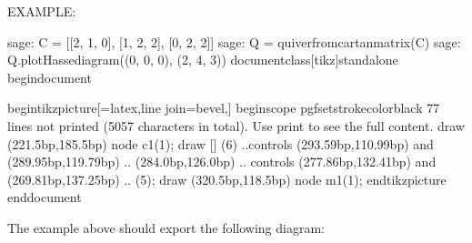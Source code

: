 \documentclass[letterpaper,10pt,english]{sphinxmanual}
\begin{document}
\begin{fulllineitems}
\begin{itemize}
\end{itemize}

\sphinxAtStartPar
EXAMPLE:

\begin{sphinxVerbatim}[commandchars=\\\{\}]
sage: C = [[2, \PYGZhy{}1, 0], [\PYGZhy{}1, 2, \PYGZhy{}2], [0, \PYGZhy{}2, 2]]
sage: Q = quiver\PYGZus{}from\PYGZus{}cartan\PYGZus{}matrix(C)
sage: Q.plot\PYGZus{}Hasse\PYGZus{}diagram((0, 0, 0), (2, 4, 3))
\PYGZbs{}documentclass[tikz]\PYGZob{}standalone\PYGZcb{}
\PYGZbs{}begin\PYGZob{}document\PYGZcb{}

\PYGZbs{}begin\PYGZob{}tikzpicture\PYGZcb{}[\PYGZgt{}=latex,line join=bevel,]
\PYGZpc{}\PYGZpc{}
\PYGZbs{}begin\PYGZob{}scope\PYGZcb{}
    \PYGZbs{}pgfsetstrokecolor\PYGZob{}black\PYGZcb{}
\PYGZhy{}\PYGZhy{}\PYGZhy{}
77 lines not printed (5057 characters in total).
Use print to see the full content.
\PYGZhy{}\PYGZhy{}\PYGZhy{}
    \PYGZbs{}draw (221.5bp,185.5bp) node \PYGZob{}\PYGZdl{}c\PYGZus{}\PYGZob{}1\PYGZcb{}(1)\PYGZdl{}\PYGZcb{};
    \PYGZbs{}draw [\PYGZhy{}\PYGZgt{}] (6) ..controls (293.59bp,110.99bp) and (289.95bp,119.79bp)  .. (284.0bp,126.0bp) .. controls (277.86bp,132.41bp) and (269.81bp,137.25bp)  .. (5);
    \PYGZbs{}draw (320.5bp,118.5bp) node \PYGZob{}\PYGZdl{}m\PYGZus{}\PYGZob{}1\PYGZcb{}(1)\PYGZdl{}\PYGZcb{};
\PYGZpc{}
\PYGZbs{}end\PYGZob{}tikzpicture\PYGZcb{}
\PYGZbs{}end\PYGZob{}document\PYGZcb{}
\end{sphinxVerbatim}

\end{fulllineitems}


\sphinxAtStartPar
The example above should export the following diagram:


\renewcommand{\indexname}{Index}
\printindex
\end{document}
